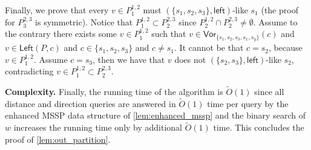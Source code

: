 \documentclass{article}
\newcommand{\Left}{\mathsf{Left}}
\newcommand{\leftside}{\mathsf{left}}
\newcommand{\Vor}{\textsf{Vor}}
\newcommand{\Otild}{\tilde{O}}
\begin{document}
Finally, we prove that every $v\in P^{1,2}_1$ must $(\{s_1,s_2,s_3\},\leftside)$-like $s_1$ (the proof for $P^{2,3}_3$ is symmetric).
Notice that $P^{1,2}_1\subset P^{2,3}_2$ since $P^{1,2}_2\cap P^{2,3}_2\ne \emptyset$.
Assume to the contrary there exists some $v\in P^{1,2}_1$ such that $v\in\Vor_{\{s_1,s_2,s_3,s_x,s_y\}}(c)$ and $v\in\Left(P,c)$ and $c\in\{s_1,s_2,s_3\}$ and $c\ne s_1$.
It cannot be that $c=s_2$, because $v\in P^{1,2}_1$.
Assume $c=s_3$, then we have that $v$ does not $(\{s_2,s_3\},\leftside)$-like $s_2$, contradicting $v\in P^{1,2}_1\subset P^{2,3}_2$.

\medskip
\noindent
{\bf Complexity.} Finally, the running time of the algorithm is $\Otild(1)$ since all distance and direction queries are answered in $\Otild(1)$ time per query by the enhanced MSSP data structure of \cref{lem:enhanced_mssp}
and the binary search of $w$ increases the running time only by additional $\Otild(1)$ time.
This concludes the proof of \cref{lem:out_partition}.
\end{document}
